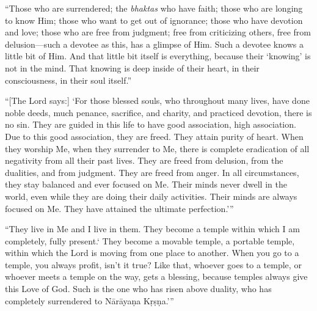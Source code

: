\enquote{Those who are surrendered; the \textit{bhaktas} who have faith; those who are longing to know Him; those who want to get out of ignorance; those who have devotion and love; those who are free from judgment; free from criticizing others, free from delusion---such a devotee as this, has a glimpse of Him. Such a devotee knows a little bit of Him. And that little bit itself is everything, because their \enquote{knowing} is not in the mind. That knowing is deep inside of their heart, in their consciousness, in their soul itself.}

\enquote{[The Lord says:] \enquote{For those blessed souls, who throughout many lives, have done noble deeds, much penance, sacrifice, and charity, and practiced devotion, there is no sin. They are guided in this life to have good association, high association. Due to this good association, they are freed. They attain purity of heart. When they worship Me, when they surrender to Me, there is complete eradication of all negativity from all their past lives. They are freed from delusion, from the dualities, and from judgment. They are freed from anger. In all circumstances, they stay balanced and ever focused on Me. Their minds never dwell in the world, even while they are doing their daily activities. Their minds are always focused on Me. They have attained the ultimate perfection.}}

\enquote{They live in Me and I live in them. They become a temple within which I am completely, fully present.\enquote{ They become a movable temple, a portable temple, within which the Lord is moving from one place to another. When you go to a temple, you always profit, isn’t it true? Like that, whoever goes to a temple, or whoever meets a temple on the way, gets a blessing, because temples always give this Love of God. Such is the one who has risen above duality, who has completely surrendered to Nārāyaṇa Kṛṣṇa.}}
